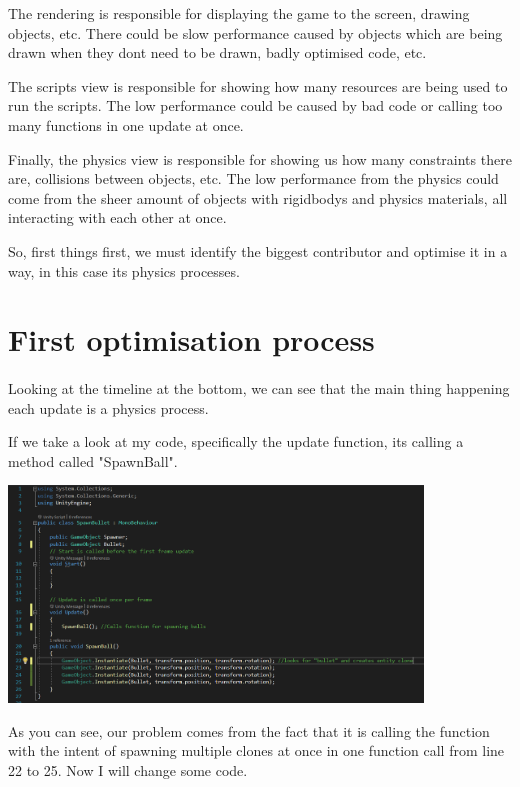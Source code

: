 \documentclass{article}
\begin{document}
The rendering is responsible for displaying the game to the screen, drawing objects, etc. There could be slow performance caused by objects which are being drawn when they dont need to be drawn, badly optimised code, etc.

The scripts view is responsible for showing how many resources are being used to run the scripts. The low performance could be caused by bad code or calling too many functions in one update at once.

Finally, the physics view is responsible for showing us how many constraints there are, collisions between objects, etc. The low performance from the physics could come from the sheer amount of objects with rigidbodys and physics materials, all interacting with each other at once.

\par So, first things first, we must identify the biggest contributor and optimise it in a way, in this case its physics processes.
\newpage

\section{First optimisation process}

\paragraph{} Looking at the timeline at the bottom, we can see that the main thing happening each update is a physics process.

If we take a look at my code, specifically the update function, its calling a method called "SpawnBall".

\includegraphics[width=11cm]{images/code1.png}\par
As you can see, our problem comes from the fact that it is calling the function with the intent of spawning multiple clones at once in one function call from line 22 to 25. Now I will change some code.
\end{document}
